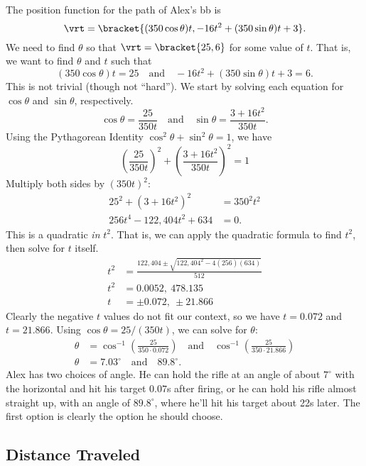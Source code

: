 {The position function for the path of Alex's bb is
\[\vrt =\bracket{(350\cos \theta)t, -16t^2+(350\sin\theta)t+3}.\]
We need to find $\theta$ so that $\vrt =\bracket{25,6}$ for some value of $t$. That is, we want to find $\theta$ and $t$ such that 
\[(350\cos\theta)t = 25 \quad \text{and}\quad -16t^2+(350\sin\theta)t+3 = 6.\]
This is not trivial (though not ``hard''). We start by solving each equation for $\cos\theta$ and $\sin \theta$, respectively.
\[\cos\theta = \frac{25}{350t} \quad \text{and} \quad \sin\theta = \frac{3+16t^2}{350t}.\]
Using the Pythagorean Identity $\cos^2\theta+\sin^2\theta=1$, we have
\[\left(\frac{25}{350t}\right)^2 + \left(\frac{3+16t^2}{350t}\right)^2 =1\]
Multiply both sides by $(350t)^2$:
\begin{align*}
25^2 + (3+16t^2)^2 &=350^2t^2\\
256t^4-122,404t^2+634 &=0.
\end{align*}
This is a quadratic \emph{in} $t^2$. That is, we can apply the quadratic formula  to find $t^2$, then solve for $t$ itself.
\begin{align*}
t^2 &= \frac{122,404\pm\sqrt{122,404^2-4(256)(634)}}{512}\\
t^2 &= 0.0052,\ 478.135\\
t &=  \pm 0.072,\ \pm 21.866
\end{align*}
Clearly the negative $t$ values do not fit our context, so we have $t=0.072$ and $t=21.866$. Using $\cos \theta = 25/(350 t)$, we can solve for $\theta$:
\begin{align*}
\theta &= \cos^{-1}\left(\frac{25}{350\cdot 0.072}\right)\quad \text{and}\quad \cos^{-1}\left(\frac{25}{350\cdot 21.866}\right)\\
\theta &= 7.03^\circ \quad \text{and} \quad 89.8^\circ.
\end{align*}
Alex has two choices of angle. He can hold the rifle at an angle of about $7^\circ$ with the horizontal and hit his target $0.07$s after firing, or he can hold his rifle almost straight up, with an angle of $89.8^\circ$, where he'll hit his target about 22s later. The first option is clearly the option he should choose.}

\subsection{Distance Traveled}

